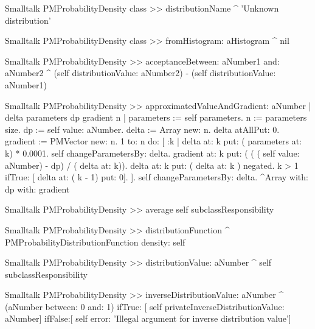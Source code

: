 \begin{displaycode}{Smalltalk}
PMProbabilityDensity class >> distributionName
    ^ 'Unknown distribution'
\end{displaycode}

\begin{displaycode}{Smalltalk}
PMProbabilityDensity class >> fromHistogram: aHistogram
    ^ nil
\end{displaycode}

\begin{displaycode}{Smalltalk}
PMProbabilityDensity >> acceptanceBetween: aNumber1 and: aNumber2
    ^ (self distributionValue: aNumber2) - (self distributionValue: 
                                                             aNumber1)
\end{displaycode}

\begin{displaycode}{Smalltalk}                                                             
PMProbabilityDensity >> approximatedValueAndGradient: aNumber
    | delta parameters dp gradient n |
    parameters := self parameters.
    n := parameters size.
    dp := self value: aNumber.
    delta := Array new: n.
    delta atAllPut: 0.
    gradient := PMVector new: n.
    1 to: n do:
        [ :k |
          delta at: k put: ( parameters at: k) * 0.0001.
          self changeParametersBy: delta.
          gradient at: k put: ( ( ( self value: aNumber) - dp) / ( 
                                                        delta at: k)).
          delta at: k put: ( delta at: k ) negated.
          k > 1
            ifTrue: [ delta at: ( k - 1) put: 0].
        ].
    self changeParametersBy: delta.
    ^Array with: dp with: gradient
\end{displaycode}

\begin{displaycode}{Smalltalk}
PMProbabilityDensity >> average
    self subclassResponsibility
\end{displaycode}

\begin{displaycode}{Smalltalk}
PMProbabilityDensity >> distributionFunction
    ^ PMProbabilityDistributionFunction density: self
\end{displaycode}

\begin{displaycode}{Smalltalk}
PMProbabilityDensity >> distributionValue: aNumber
    ^ self subclassResponsibility
\end{displaycode}

\begin{displaycode}{Smalltalk}
    PMProbabilityDensity >> inverseDistributionValue: aNumber
    ^ (aNumber between: 0 and: 1)
            ifTrue: [ self privateInverseDistributionValue: aNumber]
            ifFalse:[ self error: 'Illegal argument for inverse 
                                                  distribution value']
\end{displaycode}

